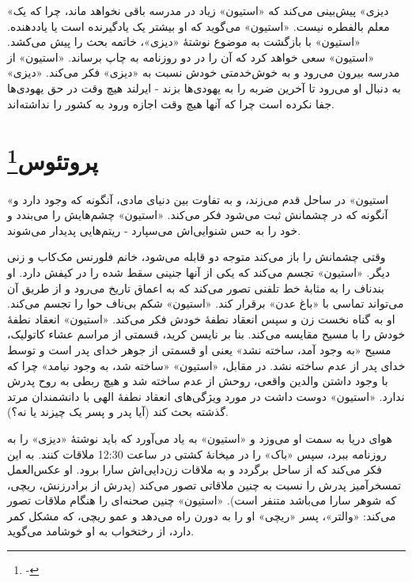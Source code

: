 \documentclass[12pt]{book}
\newcommand{\noun}[1]{«{#1}»}
\begin{document}
    \noun{دیزی} پیش‌بینی می‌کند که \noun{استیون} زیاد در مدرسه باقی نخواهد ماند، چرا که یک معلم بالفطره نیست. \noun{استیون} می‌گوید که او بیشتر یک یادگیرنده است یا یاددهنده. \noun{استیون} با بازگشت به موضوع نوشتۀ \noun{دیزی}، خاتمه بحث را پیش می‌کشد. \noun{استیون} سعی خواهد کرد که آن را در دو روزنامه به چاپ برساند. \noun{استیون} از مدرسه بیرون می‌رود و به خوش‌خدمتی خودش نسبت به \noun{دیزی} فکر می‌کند. \noun{دیزی} به دنبال او می‌رود تا آخرین ضربه را به یهودی‌ها بزند - ایرلند هیچ وقت در حق یهودی‌ها جفا نکرده است چرا که آنها هیچ وقت اجازه ورود به کشور را نداشته‌اند.

    \chapter[پروتئوس]{پروتئوس\protect\footnote{-}}\label{ep:3}
    \noun{استیون} در ساحل قدم می‌زند، و به تفاوت بین دنیای مادی، آنگونه که وجود دارد و آنگونه که در چشمانش ثبت می‌شود فکر می‌کند. \noun{استیون} چشم‌هایش را می‌بندد و خود را به حس شنوایی‌اش می‌سپارد - ریتم‌هایی پدیدار می‌شوند.

    وقتی چشمانش را باز می‌کند متوجه دو قابله می‌شود، خانم فلورنس مک‌کاب و زنی دیگر. \noun{استیون} تجسم می‌کند که یکی از آنها جنینی سقط شده را در کیفش دارد. او بندناف را به مثابۀ خط تلفنی تصور می‌کند که به اعماق تاریخ می‌رود و از طریق آن می‌تواند تماسی با «باغ عدن» برقرار کند. \noun{استیون} شکم بی‌ناف حوا را تجسم می‌کند. او به گناه نخست زن و سپس انعقاد نطفۀ خودش فکر می‌کند. \noun{استیون} انعقاد نطفۀ خودش را با مسیح مقایسه می‌کند. بنا بر نایسن کرید، قسمتی از مراسم عشاء کاتولیک، مسیح «به وجود آمد، ساخته نشد» یعنی او قسمتی از جوهر خدای پدر است و توسط خدای پدر از عدم ساخته نشد. در مقابل، \noun{استیون} «ساخته شد، به وجود نیامد» چرا که با وجود داشتن والدین واقعی، روحش از عدم ساخته شد و هیچ ربطی به روح پدرش ندارد. \noun{استیون} دوست داشت در مورد ویژگی‌های انعقاد نطفۀ الهی با دانشمندان مرتد گذشته بحث کند (آیا پدر و پسر یک چیزند یا نه؟).

    هوای دریا به سمت او می‌وزد و \noun{استیون} به یاد می‌آورد که باید نوشتۀ \noun{دیزی} را به روزنامه ببرد، سپس \noun{باک}  را در میخانۀ کشتی در ساعت 12:30 ملاقات کنند. به این فکر می‌کند که از ساحل برگردد و به ملاقات زن‌دایی‌اش سارا برود. او عکس‌العمل تمسخرآمیز پدرش را نسبت به چنین ملاقاتی تصور می‌کند (پدرش از برادرزنش، ریچی، که شوهر سارا می‌باشد متنفر است). \noun{استیون} چنین صحنه‌ای را هنگام ملاقات تصور می‌کند: \noun{والتر}، پسر \noun{ریچی} او را به دورن راه می‌دهد و عمو ریچی، که مشکل کمر دارد، از رختخواب به او خوشامد می‌گوید.
\end{document}
